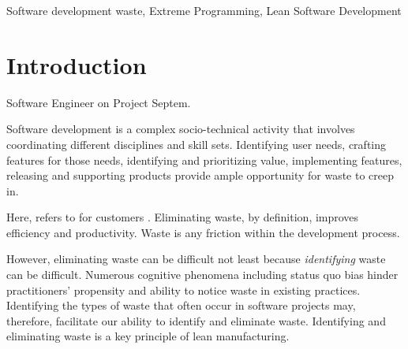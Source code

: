 \begin{IEEEkeywords}
Software development waste,
Extreme Programming,
Lean Software Development
\end{IEEEkeywords}

%
\IEEEpeerreviewmaketitle

\section{Introduction}
 \textemdash Software Engineer on Project Septem.

Software development is a complex socio-technical activity that involves coordinating different disciplines and skill sets. Identifying user needs, crafting features for those needs, identifying and prioritizing value, implementing features, releasing and supporting products provide ample opportunity for waste to creep in. 

Here,  refers to  for customers \cite{WomackLeanThinking}. Eliminating waste, by definition, improves efficiency and productivity. Waste is any friction within the development process.

However, eliminating waste can be difficult not least because \textit{identifying} waste can be difficult.  Numerous cognitive phenomena including status quo bias \cite{JostDecadeOfSystemJustification} hinder practitioners' propensity and ability to notice waste in existing practices. Identifying the types of waste that often occur in software projects  may, therefore, facilitate our ability to identify and eliminate waste. Identifying and eliminating waste is a key principle of lean manufacturing. 

